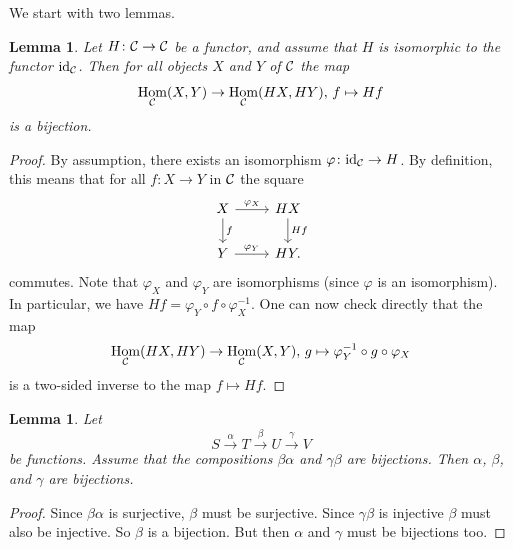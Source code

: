 \documentclass[11pt]{amsbook}
\newcommand{\longto}{\longrightarrow}
\DeclareMathOperator\Hom{Hom}
\def\id{{\rm id}}
\theoremstyle{plain}
\newtheorem{lemma}[theorem]{Lemma}
\theoremstyle{definition}
\begin{document}
We start with two lemmas. 

\begin{lemma}\label{lemma:functor-iso-to-id}
Let $H\colon {\mathcal{C}} \to {\mathcal{C}}$ be a functor, and assume that $H$ is isomorphic to the functor $\id_\cC$. Then for all objects $X$ and $Y$ of ${\mathcal{C}}$ the map
\[
	\Hom_\cC(X,Y) \to \Hom_\cC(HX, HY),\, f \mapsto Hf
\]
is a bijection.
\end{lemma}

\begin{proof}
By assumption, there exists an isomorphism $\varphi\colon \id_\cC \to H$. By definition, this means that for all $f\colon X\to Y$ in ${\mathcal{C}}$ the square
\[
\begin{tikzcd}
	X \arrow{r}{\varphi_X} \arrow{d}{f} & HX \arrow{d}{Hf} \\
	Y \arrow{r}{\varphi_Y} & HY.
\end{tikzcd}
\]
commutes. Note that $\varphi_X$ and $\varphi_Y$ are isomorphisms (since $\varphi$ is an isomorphism). In particular, we have $Hf = \varphi_Y \circ f \circ \varphi_X^{-1}$. One can now check directly that the map
\[
	\Hom_\cC(HX,HY) \to \Hom_\cC(X,Y),\, g \mapsto \varphi_Y^{-1} \circ g \circ \varphi_X
\]
is a two-sided inverse to the map $f\mapsto Hf$.
\end{proof}

\begin{lemma}\label{lemma:two-out-of-three}
Let 
\[
	S \overset\alpha\longto T \overset\beta\longto U \overset\gamma\longto V
\]
be functions. Assume that the compositions $\beta\alpha$ and $\gamma\beta$ are bijections. Then $\alpha$, $\beta$, and $\gamma$ are bijections.
\end{lemma}

\begin{proof}
Since $\beta\alpha$ is surjective, $\beta$ must be surjective. Since $\gamma\beta$ is injective $\beta$ must also be injective. So $\beta$ is a bijection. But then $\alpha$ and $\gamma$ must be bijections too.
\end{proof}
\end{document}
